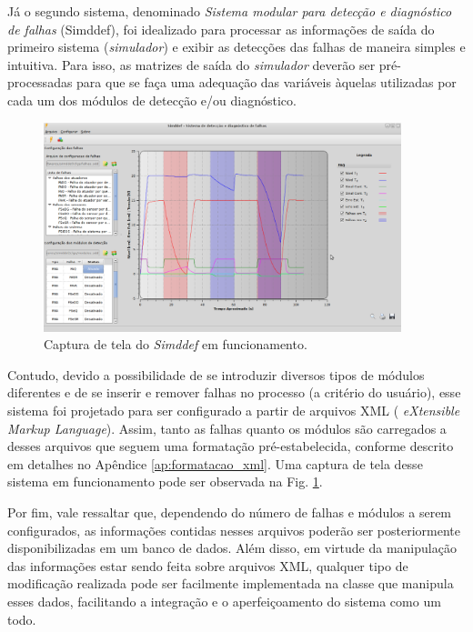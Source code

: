 Já o segundo sistema, denominado {\it Sistema modular para detecção e
diagnóstico de falhas} (Simddef), foi idealizado para processar as informações
de saída do primeiro sistema ({\it simulador}) e exibir as detecções das falhas
de maneira simples e intuitiva. Para isso, as matrizes de saída do {\it
simulador} deverão ser pré-processadas para que se faça uma adequação das
variáveis àquelas utilizadas por cada um dos módulos de detecção e/ou
diagnóstico. 


\begin{figure}[!htb]
\centering
    \includegraphics[width=0.9275\textwidth]{imgs/sistema/eps/captura_simddef}
    \caption{Captura de tela do {\it Simddef} em funcionamento.}
    \label{fig:captura_simddef}
\end{figure}

Contudo, devido a possibilidade de se introduzir diversos tipos de módulos
diferentes e de se inserir e remover falhas no processo (a critério do usuário),
esse sistema foi projetado para ser configurado a partir de arquivos XML ({\it
eXtensible Markup Language}). Assim, tanto as falhas quanto os módulos são
carregados a desses arquivos que seguem uma formatação pré-estabelecida,
conforme descrito em detalhes no Apêndice \ref{ap:formatacao_xml}. Uma captura
de tela desse sistema em funcionamento pode ser observada na Fig.
\ref{fig:captura_simddef}.


Por fim, vale ressaltar que, dependendo do número de falhas e módulos a serem
configurados, as informações contidas nesses arquivos poderão ser posteriormente
disponibilizadas em um banco de dados. Além disso, em virtude da manipulação das
informações estar sendo feita sobre arquivos XML, qualquer tipo de modificação
realizada pode ser facilmente implementada na classe que manipula esses dados,
facilitando a integração e o aperfeiçoamento do sistema como um todo.
